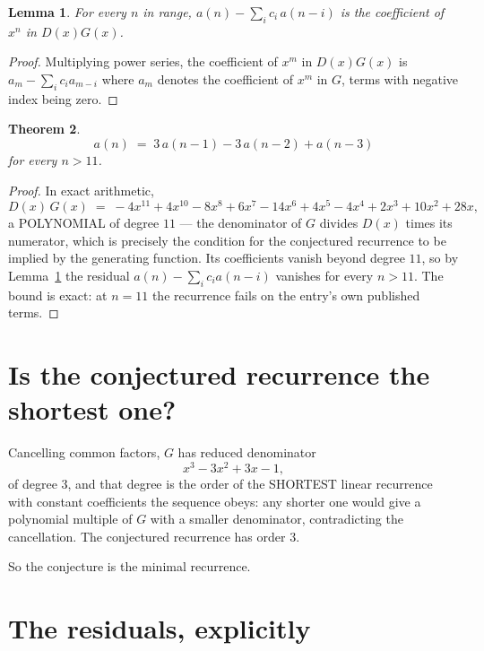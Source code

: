 \documentclass[11pt,a4paper]{article}
\theoremstyle{plain}
\newtheorem{theorem}{Theorem}
\newtheorem{lemma}[theorem]{Lemma}
\theoremstyle{definition}
\begin{document}
\begin{lemma}\label{lem:key}
For every $n$ in range, $a(n)-\sum_i c_i\,a(n-i)$ is the coefficient of $x^{n}$ in
$D(x)G(x)$.
\end{lemma}

\begin{proof}
Multiplying power series, the coefficient of $x^{m}$ in $D(x)G(x)$ is
$a_m-\sum_i c_i a_{m-i}$ where $a_m$ denotes the coefficient of $x^{m}$ in $G$, terms with
negative index being zero.
\end{proof}

\begin{theorem}
\[
a(n)\;=\;3\,a(n-1) - 3\,a(n-2) + a(n-3)
\]
for every $n>11$.
\end{theorem}

\begin{proof}
In exact arithmetic,
\[
D(x)\,G(x)\;=\;- 4 x^{11} + 4 x^{10} - 8 x^{8} + 6 x^{7} - 14 x^{6} + 4 x^{5} - 4 x^{4} + 2 x^{3} + 10 x^{2} + 28 x,
\]
a POLYNOMIAL of degree $11$ --- the denominator of $G$ divides $D(x)$ times its numerator,
which is precisely the condition for the conjectured recurrence to be implied by the
generating function. Its coefficients vanish beyond degree $11$, so by
Lemma~\ref{lem:key} the residual $a(n)-\sum_ic_ia(n-i)$ vanishes for every
$n>11$. The bound is exact: at $n=11$ the recurrence fails on the entry's own published terms.
\end{proof}

\section{Is the conjectured recurrence the shortest one?}

Cancelling common factors, $G$ has reduced denominator
\[
x^{3} - 3 x^{2} + 3 x - 1,
\]
of degree $3$, and that degree is the order of the SHORTEST linear recurrence with
constant coefficients the sequence obeys: any shorter one would give a polynomial multiple of
$G$ with a smaller denominator, contradicting the cancellation. The conjectured recurrence has
order $3$.

So the conjecture is the minimal recurrence.

\section{The residuals, explicitly}
\end{document}
